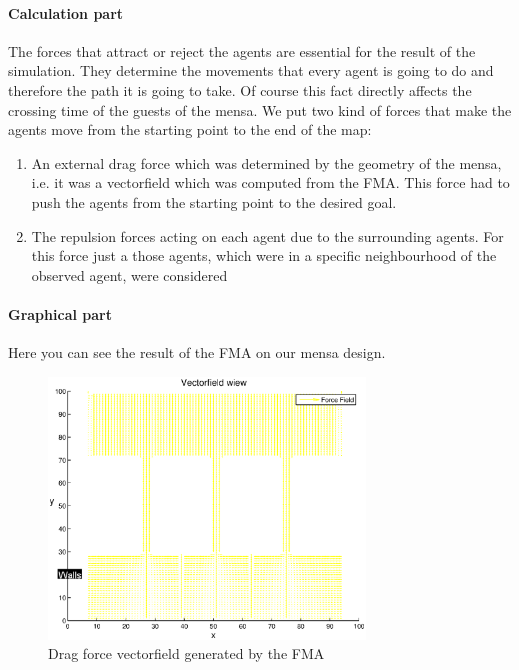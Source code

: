 \documentclass[11pt]{article}
\begin{document}
\paragraph{Calculation part}
The forces that attract or reject the agents are essential for the result of the simulation. They determine the movements that every agent is going to do and therefore the path it is going to take. Of course this fact directly affects the crossing time of the guests of the mensa.
We put two kind of forces that make the agents move from the starting point to the end of the map:
\begin{enumerate}
	\item An external drag force which was determined by the geometry of the mensa, i.e. it was a vectorfield which was computed from the FMA. This force had to push the agents from the starting point to the desired goal.
	\item The repulsion forces acting on each agent due to the surrounding agents. For this force just a those agents, which were in a specific neighbourhood of the observed agent, were considered
\end{enumerate}

\paragraph{Graphical part}

Here you can see the result of the FMA on our mensa design.

\begin{figure}[h]
 	\centering
		\includegraphics[width = 0.75\textwidth]{Images/2D_IMAGES/vecField.eps}
 	\caption{Drag force vectorfield generated by the FMA}
  	\label{vecField}
\end{figure}
\end{document}
